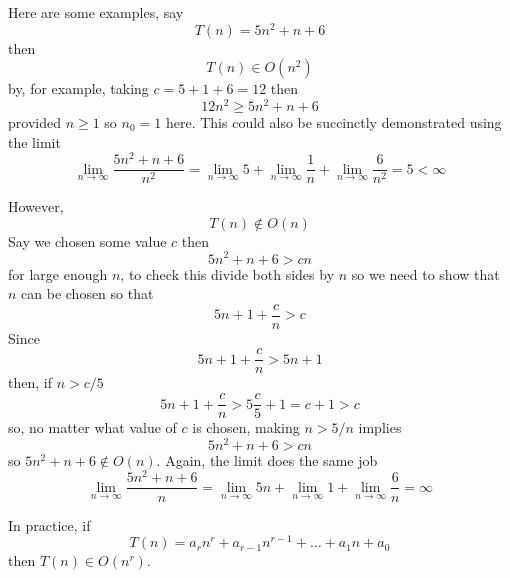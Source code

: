\documentclass[11pt,a4paper]{scrartcl}
\begin{document}
Here are some examples, say 
\begin{equation}
T(n)=5n^2+n+6
\end{equation}
then 
\begin{equation}
T(n)\in O(n^2)
\end{equation}
by, for example, taking $c=5+1+6=12$ then 
\begin{equation}
12n^2\ge 5n^2+n+6
\end{equation}
provided $n\ge 1$ so $n_0=1$ here. This could also be succinctly
demonstrated using the limit
\begin{equation}
\lim_{n\rightarrow \infty} \frac{5n^2+n+6}{n^2}=\lim_{n\rightarrow \infty}5+\lim_{n\rightarrow \infty}\frac{1}{n}+\lim_{n\rightarrow \infty}\frac{6}{n^2}=5<\infty
\end{equation}

However, 
\begin{equation}
T(n)\not\in O(n)
\end{equation}
Say we chosen some value $c$ then
\begin{equation}
5n^2+n+6>cn
\end{equation}
for large enough $n$, to check this divide both sides by $n$ so we need to show that $n$ can be chosen so that
\begin{equation}
5n+1+\frac{c}{n}>c
\end{equation}
Since 
\begin{equation}
5n+1+\frac{c}{n}>5n+1
\end{equation}
then, if $n>c/5$
\begin{equation}
5n+1+\frac{c}{n}>5\frac{c}{5}+1=c+1>c
\end{equation}
so, no matter what value of $c$ is chosen, making $n>5/n$ implies
\begin{equation}
5n^2+n+6>cn
\end{equation}
so $5n^2+n+6\not\in O(n)$. Again, the limit does the same job
\begin{equation}
\lim_{n\rightarrow \infty} \frac{5n^2+n+6}{n}=\lim_{n\rightarrow \infty}5n+\lim_{n\rightarrow \infty}1+\lim_{n\rightarrow \infty}\frac{6}{n}=\infty
\end{equation}


In practice, if
\begin{equation}
T(n)=a_rn^r+a_{r-1}n^{r-1}+\ldots+a_1n+a_0
\end{equation}
then $T(n)\in O(n^r)$. 
\end{document}
